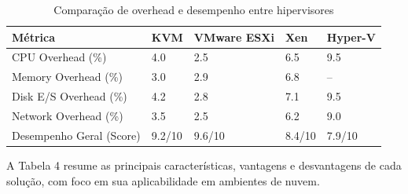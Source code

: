 \begin{table}[H]
    \centering
    \renewcommand{\arraystretch}{1.3}
    \caption{Comparação de overhead e desempenho entre hipervisores}
    \label{tab:overhead}
    \begin{tabular}{|l|l|l|l|l|}
        \hline
        \textbf{Métrica} & \textbf{KVM} & \textbf{VMware ESXi} & \textbf{Xen} & \textbf{Hyper-V} \\ \hline
        CPU Overhead (\%) & 4.0 & 2.5 & 6.5 & 9.5 \\ \hline
        Memory Overhead (\%) & 3.0 & 2.9 & 6.8 & -- \\ \hline
        Disk E/S Overhead (\%) & 4.2 & 2.8 & 7.1 & 9.5 \\ \hline
        Network Overhead (\%) & 3.5 & 2.5 & 6.2 & 9.0 \\ \hline
        Desempenho Geral (Score) & 9.2/10 & 9.6/10 & 8.4/10 & 7.9/10 \\ \hline
    \end{tabular}
\end{table}

A Tabela 4 resume as principais características, vantagens e desvantagens de cada solução, com foco em sua aplicabilidade em ambientes de nuvem.

